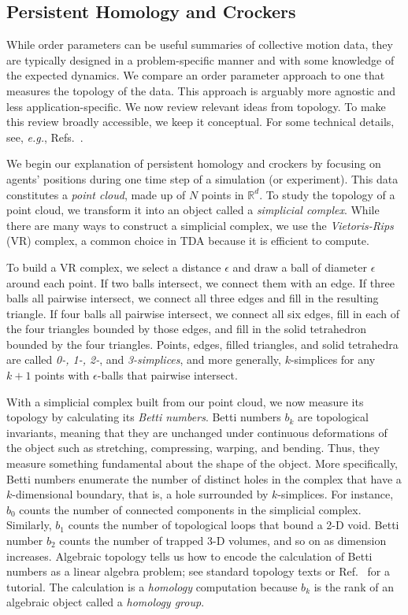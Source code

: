 \documentclass[%
 aip,
reprint,
 amsmath,amssymb,
 aps,
showkeys
]{revtex4-1}
\begin{document}
\subsection{Persistent Homology and Crockers}\label{subsec:tda}

While order parameters can be useful summaries of collective motion data, they are typically designed in a problem-specific manner and with some knowledge of the expected dynamics. We compare an order parameter approach to one that measures the topology of the data. This approach is arguably more agnostic and less application-specific. We now review relevant ideas from topology. To make this review broadly accessible, we keep it conceptual. For some technical details, see, \emph{e.g.}, Refs.~.

We begin our explanation of persistent homology and crockers by focusing on agents' positions during one time step of a simulation (or experiment). This data constitutes a \emph{point cloud}, made up of $N$ points in $\mathbb{R}^d$. To study the topology of a point cloud, we transform it into an object called a \emph{simplicial complex}. While there are many ways to construct a simplicial complex, we use the \emph{Vietoris-Rips} (VR) complex, a common choice in TDA because it is efficient to compute.

To build a VR complex, we select a distance $\epsilon$ and draw a ball of diameter $\epsilon$ around each point. If two balls intersect, we connect them with an edge. If three balls all pairwise intersect, we connect all three edges and fill in the resulting triangle. If four balls all pairwise intersect, we connect all six edges, fill in each of the four triangles bounded by those edges, and fill in the solid tetrahedron bounded by the four triangles. Points, edges, filled triangles, and solid tetrahedra are called \emph{0-, 1-, 2-}, and \emph{3-simplices}, and more generally, $k$-simplices for any $k+1$ points with $\epsilon$-balls that pairwise intersect.

With a simplicial complex built from our point cloud, we now measure its topology by calculating its \emph{Betti numbers}. Betti numbers $b_k$ are topological invariants, meaning that they are unchanged under continuous deformations of the object such as stretching, compressing, warping, and bending. Thus, they measure something fundamental about the shape of the object. More specifically, Betti numbers enumerate the number of distinct holes in the complex that have a $k$-dimensional boundary, that is, a hole surrounded by $k$-simplices. For instance, $b_0$ counts the number of connected components in the simplicial complex. Similarly, $b_1$ counts the number of topological loops that bound a 2-D void. Betti number $b_2$ counts the number of trapped 3-D volumes, and so on as dimension increases. Algebraic topology tells us how to encode the calculation of Betti numbers as a linear algebra problem; see standard topology texts or Ref.~ for a tutorial. The calculation is a \emph{homology} computation because $b_k$ is the rank of an algebraic object called a \emph{homology group}.
\end{document}
